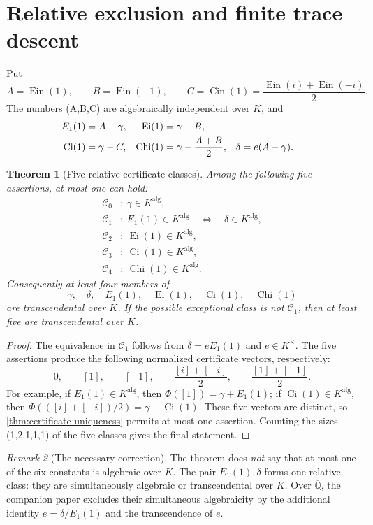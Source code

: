 \documentclass[11pt]{article}
\theoremstyle{keio}
\newtheorem{theorem}{Theorem}[section]
\theoremstyle{definition}
\theoremstyle{remark}
\newtheorem{remark}[theorem]{Remark}
\newcommand{\Qbar}{\overline{\mathbb Q}}
\newcommand{\Ein}{\operatorname{Ein}}
\newcommand{\Cin}{\operatorname{Cin}}
\newcommand{\Ei}{\operatorname{Ei}}
\newcommand{\Ci}{\operatorname{Ci}}
\newcommand{\Chi}{\operatorname{Chi}}
\begin{document}
\section{Relative exclusion and finite trace descent}
\label{sec:relative}

Put
\[
 A=\Ein(1),\qquad B=\Ein(-1),\qquad
 C=\Cin(1)=\frac{\Ein(i)+\Ein(-i)}2.
\]
The numbers (A,B,C) are algebraically independent over \(K\), and
\begin{align}
 E_1(1)&=A-\gamma,&
 \Ei(1)&=\gamma-B,\label{eq:six-identities}\\
 \Ci(1)&=\gamma-C,&
 \Chi(1)&=\gamma-\frac{A+B}{2},&
 \delta&=e(A-\gamma).\notag
\end{align}

\begin{theorem}[Five relative certificate classes]
\label{thm:five-classes}
Among the following five assertions, at most one can hold:
\begin{align*}
 \mathcal C_0&:\ \gamma\in K^{\mathrm{alg}},\\
 \mathcal C_1&:\ E_1(1)\in K^{\mathrm{alg}}
 \quad\Longleftrightarrow\quad \delta\in K^{\mathrm{alg}},\\
 \mathcal C_2&:\ \Ei(1)\in K^{\mathrm{alg}},\\
 \mathcal C_3&:\ \Ci(1)\in K^{\mathrm{alg}},\\
 \mathcal C_4&:\ \Chi(1)\in K^{\mathrm{alg}}.
\end{align*}
Consequently at least four members of
\[
 \gamma,\quad\delta,\quad E_1(1),\quad\Ei(1),\quad\Ci(1),\quad\Chi(1)
\]
are transcendental over \(K\).  If the possible exceptional class is not
\(\mathcal C_1\), then at least five are transcendental over \(K\).
\end{theorem}

\begin{proof}
The equivalence in \(\mathcal C_1\) follows from
\(\delta=eE_1(1)\) and \(e\in K^\times\).  The five assertions produce the
following normalized certificate vectors, respectively:
\[
 0,\qquad [1],\qquad[-1],\qquad
 \frac{[i]+[-i]}2,\qquad
 \frac{[1]+[-1]}2.
\]
For example, if \(E_1(1)\in K^{\mathrm{alg}}\), then
\(\Phi([1])=\gamma+E_1(1)\); if \(\Ci(1)\in K^{\mathrm{alg}}\), then
\(\Phi(([i]+[-i])/2)=\gamma-\Ci(1)\).  These five vectors are distinct, so
\cref{thm:certificate-uniqueness} permits at most one assertion.  Counting
the sizes (1,2,1,1,1) of the five classes gives the final statement.
\end{proof}

\begin{remark}[The necessary correction]
The theorem does \emph{not} say that at most one of the six constants is
algebraic over \(K\).  The pair \(E_1(1),\delta\) forms one relative class:
they are simultaneously algebraic or transcendental over \(K\).  Over
\(\Qbar\), the companion paper excludes their simultaneous algebraicity by
the additional identity \(e=\delta/E_1(1)\) and the transcendence of \(e\).
\end{remark}
\end{document}

